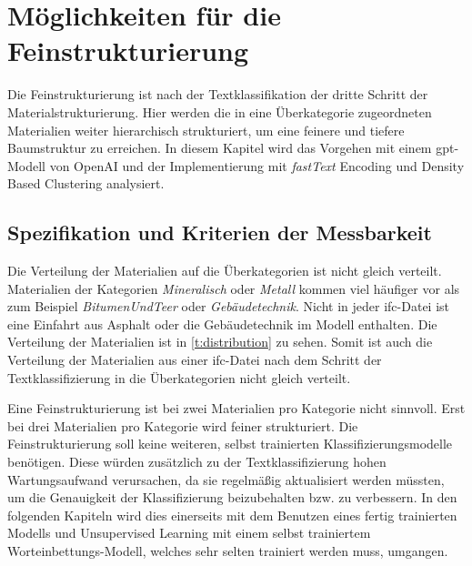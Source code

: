 \section{Möglichkeiten für die Feinstrukturierung}
\label{c:conception:fine-structuring}
Die Feinstrukturierung ist nach der Textklassifikation der dritte Schritt der Materialstrukturierung. Hier werden die in eine Überkategorie zugeordneten Materialien weiter hierarchisch strukturiert, um eine feinere und tiefere Baumstruktur zu erreichen. In diesem Kapitel wird das Vorgehen mit einem \ac{gpt}-Modell von OpenAI und der Implementierung mit \textit{fastText} Encoding und Density Based Clustering analysiert.

\subsection{Spezifikation und Kriterien der Messbarkeit}
\label{c:conception:fine-structuring:criteria}
Die Verteilung der Materialien auf die Überkategorien ist nicht gleich verteilt. Materialien der Kategorien \textit{Mineralisch} oder \textit{Metall} kommen viel häufiger vor als zum Beispiel \textit{BitumenUndTeer} oder \textit{Gebäudetechnik}. Nicht in jeder \ac{ifc}-Datei ist eine Einfahrt aus Asphalt oder die Gebäudetechnik im Modell enthalten. Die Verteilung der Materialien ist in \autoref{t:distribution} zu sehen. Somit ist auch die Verteilung der Materialien aus einer \ac{ifc}-Datei nach dem Schritt der Textklassifizierung in die Überkategorien nicht gleich verteilt.

Eine Feinstrukturierung ist bei zwei Materialien pro Kategorie nicht sinnvoll. Erst bei drei Materialien pro Kategorie wird feiner strukturiert. Die Feinstrukturierung soll keine weiteren, selbst trainierten Klassifizierungsmodelle benötigen. Diese würden zusätzlich zu der Textklassifizierung hohen Wartungsaufwand verursachen, da sie regelmäßig aktualisiert werden müssten, um die Genauigkeit der Klassifizierung beizubehalten bzw. zu verbessern. In den folgenden Kapiteln wird dies einerseits mit dem Benutzen eines fertig trainierten Modells und Unsupervised Learning mit einem selbst trainiertem Worteinbettungs-Modell, welches sehr selten trainiert werden muss, umgangen.

